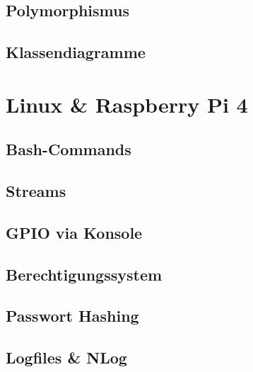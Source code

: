 \documentclass[
  9pt,
  a4paperpaper,
  DIV=11]{scrartcl}
\numberwithin{equation}{section}
\begin{document}
\begin{multicols}{2}
\hypertarget{polymorphismus}{%
\subsection{Polymorphismus}\label{polymorphismus}}

\hypertarget{klassendiagramme}{%
\subsection{Klassendiagramme}\label{klassendiagramme}}

\hypertarget{linux-raspberry-pi-4}{%
\section{Linux \& Raspberry Pi 4}\label{linux-raspberry-pi-4}}

\hypertarget{bash-commands}{%
\subsection{Bash-Commands}\label{bash-commands}}

\hypertarget{streams-1}{%
\subsection{Streams}\label{streams-1}}

\hypertarget{gpio-via-konsole}{%
\subsection{GPIO via Konsole}\label{gpio-via-konsole}}

\hypertarget{berechtigungssystem}{%
\subsection{Berechtigungssystem}\label{berechtigungssystem}}

\hypertarget{passwort-hashing}{%
\subsection{Passwort Hashing}\label{passwort-hashing}}

\hypertarget{logfiles-nlog}{%
\subsection{Logfiles \& NLog}\label{logfiles-nlog}}

\hypertarget{benutzerverwaltung}{%
}
\end{multicols}
\end{document}
